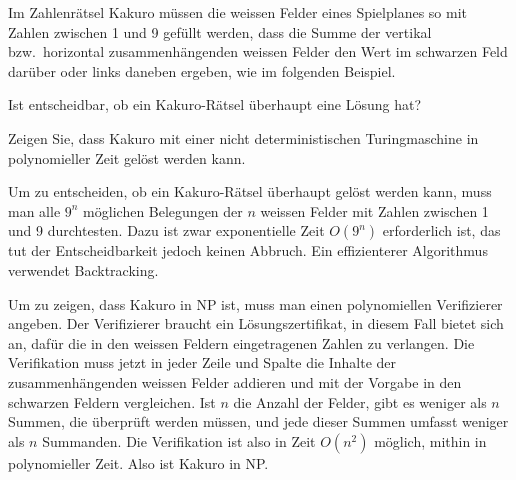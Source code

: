 Im Zahlenrätsel Kakuro müssen die weissen Felder eines Spielplanes
so mit Zahlen zwischen 1 und 9 gefüllt werden, dass die Summe der
vertikal bzw.~horizontal zusammenhängenden weissen Felder den Wert im
schwarzen Feld darüber oder links daneben ergeben, wie im folgenden
Beispiel. 
\begin{center}
\end{center}
\begin{teilaufgaben}
\item 
Ist entscheidbar, ob ein Kakuro-Rätsel überhaupt eine Lösung
hat?
\item
Zeigen Sie, dass Kakuro mit einer nicht deterministischen Turingmaschine
in polynomieller Zeit gelöst werden kann.
\end{teilaufgaben}

\begin{loesung}
\begin{teilaufgaben}
\item
Um zu entscheiden, ob ein Kakuro-Rätsel überhaupt gelöst werden
kann, muss man alle $9^n$ möglichen Belegungen der $n$ weissen
Felder mit Zahlen zwischen 1 und 9 durchtesten. Dazu ist zwar
exponentielle Zeit $O(9^n)$ erforderlich ist, das tut der Entscheidbarkeit
jedoch keinen Abbruch.
Ein effizienterer Algorithmus verwendet Backtracking.
\item
Um zu zeigen, dass Kakuro in NP ist, muss man einen polynomiellen
Verifizierer angeben. Der Verifizierer braucht ein Lösungszertifikat,
in diesem Fall bietet sich an, dafür die in den weissen Feldern eingetragenen
Zahlen zu verlangen. Die Verifikation muss jetzt in jeder Zeile und
Spalte die Inhalte der zusammenhängenden weissen Felder addieren und 
mit der Vorgabe in den schwarzen Feldern vergleichen. Ist $n$ die Anzahl
der Felder, gibt es weniger als $n$ Summen, die überprüft werden müssen,
und jede dieser Summen umfasst weniger als $n$ Summanden. Die Verifikation
ist also in Zeit $O(n^2)$ möglich, mithin in polynomieller Zeit.
Also ist Kakuro in NP.
\qedhere
\end{teilaufgaben}
\end{loesung}
